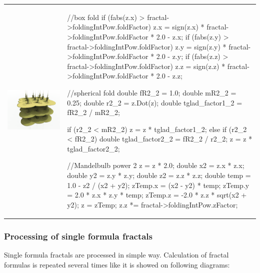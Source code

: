 \begin{tabular}{l l}
	\includegraphics[width=0.3\linewidth]{img/manual/media/formula_box_fold_pwr2.png}	
	& 
	\begin{minipage}[b]{0.5\linewidth}
		\begin{cppcode}
//box fold
if (fabs(z.x) > fractal->foldingIntPow.foldFactor)
	z.x = sign(z.x) * fractal->foldingIntPow.foldFactor
		 * 2.0 - z.x;
if (fabs(z.y) > fractal->foldingIntPow.foldFactor)
	z.y = sign(z.y) * fractal->foldingIntPow.foldFactor
		 * 2.0 - z.y;
if (fabs(z.z) > fractal->foldingIntPow.foldFactor)
	z.z = sign(z.z) * fractal->foldingIntPow.foldFactor
		 * 2.0 - z.z;

//spherical fold
double fR2_2 = 1.0;
double mR2_2 = 0.25;
double r2_2 = z.Dot(z);
double tglad_factor1_2 = fR2_2 / mR2_2;

if (r2_2 < mR2_2)
{
	z = z * tglad_factor1_2;
}
else if (r2_2 < fR2_2)
{
	double tglad_factor2_2 = fR2_2 / r2_2;
	z = z * tglad_factor2_2;
}

//Mandelbulb power 2
z = z * 2.0;
double x2 = z.x * z.x;
double y2 = z.y * z.y;
double z2 = z.z * z.z;
double temp = 1.0 - z2 / (x2 + y2);
zTemp.x = (x2 - y2) * temp;
zTemp.y = 2.0 * z.x * z.y * temp;
zTemp.z = -2.0 * z.z * sqrt(x2 + y2);
z = zTemp;
z.z *= fractal->foldingIntPow.zFactor;
		\end{cppcode}
	\end{minipage}
\end{tabular} 

\subsubsection{Processing of single formula fractals}

Single formula fractals are processed in simple way. Calculation of fractal
formulas is repeated several times like it is showed on following
diagrams:\nolinebreak \nopagebreak

